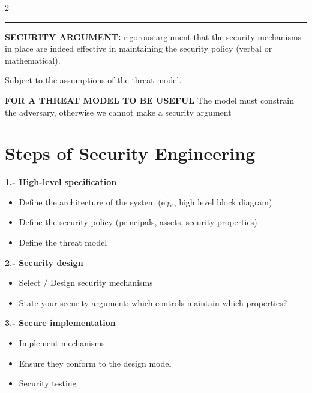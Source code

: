 \documentclass[a4paper,9pt]{extarticle}
\newcommand{\separator}{
\vspace{2pt}
\hrule
\vspace{3pt}
}
\begin{document}
\begin{multicols}{2}
\separator


\begin{definition}

\textbf{SECURITY ARGUMENT:} rigorous argument that the security mechanisms in place are
indeed effective in maintaining the security policy (verbal or mathematical).

Subject to the assumptions of the threat model.

\end{definition}


\begin{warning}

\textbf{FOR A THREAT MODEL TO BE USEFUL} The model must constrain the adversary, otherwise we cannot
make a security argument

\end{warning}



\section{Steps of Security Engineering}


\begin{summary}

\textbf{1.- High-level specification}

\begin{itemize}

\item Define the architecture of the system (e.g., high level block diagram)

\item Define the security policy (principals, assets, security properties)

\item Define the threat model

\end{itemize}

\textbf{2.- Security design}

\begin{itemize}

\item Select / Design security mechanisms

\item State your security argument: which controls maintain which
properties?

\end{itemize}

\textbf{3.- Secure implementation}

\begin{itemize}

\item Implement mechanisms

\item Ensure they conform to the design model

\item Security testing

\end{itemize}

\end{summary}



\end{multicols}
\end{document}
